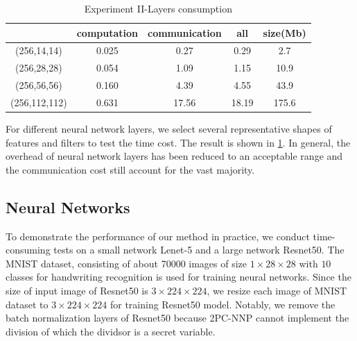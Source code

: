 \documentclass[letterpaper]{article} %
\begin{document}
\begin{table}[!ht]
{\begin{tabular}{|c|c|c|c|c|c|}
        \cline{3-5}
        \multicolumn{2}{|c|}{} &computation&communication&all&size(Mb)\\ \hline
        \multicolumn{2}{|c|}{(256,14,14)} & 0.025  & 0.27 & 0.29 &2.7	\\ \hline
        \multicolumn{2}{|c|}{(256,28,28)} & 0.054 & 1.09 & 1.15 & 10.9 \\ \hline
        \multicolumn{2}{|c|}{(256,56,56)} & 0.160  & 4.39 & 4.55 &43.9	\\ \hline
        \multicolumn{2}{|c|}{(256,112,112)} & 0.631 & 17.56 & 18.19 & 175.6 \\ \hline

        \end{tabular}}

        \caption{Experiment II-Layers consumption}
        \label{Layers_consumption}
    \end{table}


    For different neural network layers,
    we select several representative shapes of features and filters
    to test the time cost.
    The result is shown in \ref{Layers_consumption}.
    In general, the overhead of neural network layers has been reduced to an acceptable range
    and the communication cost still account for the vast majority.






    \subsection{Neural Networks}
    To demonstrate the performance of our method in practice, we conduct
    time-consuming tests on a small network Lenet-5 and a large network Resnet50.
    The MNIST dataset, consisting of about 70000 images of size $1\times 28 \times 28$ with $10$ classes
    for handwriting recognition is used for training neural networks.
    Since the size of input image of Resnet50 is $3\times 224 \times 224$,
    we resize each image of MNIST dataset to $3\times 224 \times 224$ for training Resnet50 model.
    Notably, we remove the batch normalization layers of Resnet50 because 2PC-NNP
    cannot implement the division of which the dividsor is a secret variable.
\end{document}
